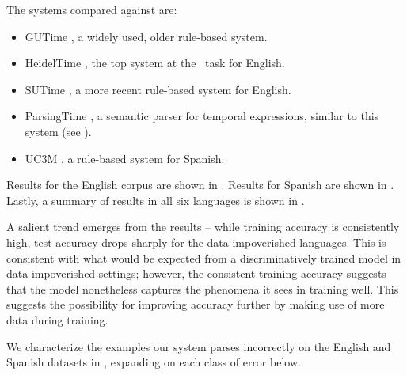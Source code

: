 The systems compared against are:
\begin{itemize}
\setlength{\itemsep}{0cm}
\item GUTime \cite{key:2000mani-temporal}, a widely used, older rule-based
              system.
\item HeidelTime \cite{key:2010strotgen-temporal}, the top
                 system at the \tempeval\ task for English.
\item SUTime \cite{key:2012chang-temporal}, a more recent rule-based
             system for English.
\item ParsingTime \mec, a semantic parser for temporal expressions, similar to
                  this system (see ).
\item UC3M \cite{2010vicente-uc3m}, a rule-based system for
             Spanish.
\end{itemize}

Results for the English corpus are shown in .
Results for Spanish are shown in .
Lastly, a summary of results in all six languages is shown in
  .

A salient trend emerges from the results -- while training accuracy is
  consistently high, test accuracy drops sharply for the data-impoverished
  languages.
This is consistent with what would be expected from a discriminatively trained
  model in data-impoverished settings; however, the consistent training accuracy
  suggests that the model nonetheless captures the phenomena it sees
  in training well.
This suggests the possibility for improving accuracy further by making use of
  more data during training.


We characterize the examples our system parses incorrectly
  on the English and Spanish datasets in
  , expanding on each class of error below.


